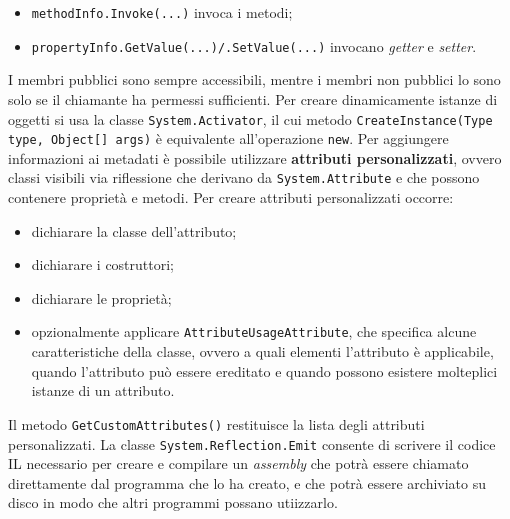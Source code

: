 \begin{solution}
\begin{itemize}
	\item \texttt{methodInfo.Invoke(...)} invoca i metodi;
	\item \texttt{propertyInfo.GetValue(...)/.SetValue(...)} invocano \textit{getter} e \textit{setter}.
\end{itemize}
\raggedright I membri pubblici sono sempre accessibili, mentre i membri non pubblici lo sono solo se il chiamante ha permessi sufficienti.
Per creare dinamicamente istanze di oggetti si usa la classe \texttt{System.Activator}, il cui metodo \texttt{CreateInstance(Type type, Object[] args)} è equivalente all'operazione \texttt{new}.
\newline\newline
Per aggiungere informazioni ai metadati è possibile utilizzare \textbf{attributi personalizzati}, ovvero classi visibili via riflessione che derivano da \texttt{System.Attribute} e che possono contenere proprietà e metodi.
\newline
Per creare attributi personalizzati occorre:
\begin{itemize}
	\item dichiarare la classe dell'attributo;
	\item dichiarare i costruttori;
	\item dichiarare le proprietà;
	\item opzionalmente applicare \texttt{AttributeUsageAttribute}, che specifica alcune caratteristiche della classe, ovvero a quali elementi l'attributo è applicabile, quando l'attributo può essere ereditato e quando possono esistere molteplici istanze di un attributo.
\end{itemize}
Il metodo \texttt{GetCustomAttributes()} restituisce la lista degli attributi personalizzati.
\newline
La classe \texttt{System.Reflection.Emit} consente di scrivere il codice IL necessario per creare e compilare un \textit{assembly} che potrà essere chiamato direttamente dal programma che lo ha creato, e che potrà essere archiviato su disco in modo che altri programmi possano utiizzarlo.
\end{solution}


